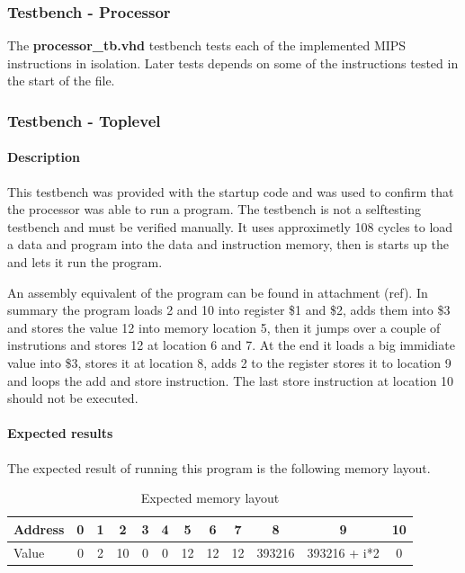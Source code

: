 \subsubsection{Testbench - Processor}
The {\bf processor\_tb.vhd} testbench tests each of the implemented MIPS instructions in isolation. Later tests depends on some of the instructions tested in the start of the file.
\subsubsection{Testbench - Toplevel}

\paragraph{Description}

This testbench was provided with the startup code and was used to confirm that the processor was able to run a program. The testbench is not a selftesting testbench and must be verified manually. It uses approximetly 108 cycles to load a data and program into the data and instruction memory, then is starts up the and lets it run the program.

An assembly equivalent of the program can be found in attachment (ref).
In summary the program loads 2 and 10 into register \$1 and \$2, adds them into \$3 and stores the value 12 into memory location 5, then it jumps over a couple of instrutions and stores 12 at location 6 and 7. At the end it loads a big immidiate value into \$3, stores it at location 8, adds 2 to the register stores it to location 9 and loops the add and store instruction. The last store instruction at location 10 should not be executed.

\paragraph{Expected results}

The expected result of running this program is the following memory layout. 
\begin{table}[h]
	\begin{tabular}{|l|c|c|c|c|c|c|c|c|c|c|c|}
		\hline
		Address &  0 &  1 &  2 &  3 &  4 &  5 &  6 &  7 &  8 &  9 & 10 \\
		\hline
		Value   &  0 &  2 & 10 &  0 & 0 & 12  & 12 & 12 & 393216 & 393216 + i*2 & 0\\
		\hline
	\end{tabular}
	\caption{Expected memory layout}
\end{table}

